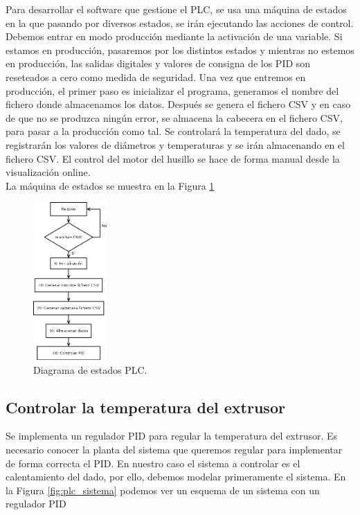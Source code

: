 Para desarrollar el software que gestione el PLC, se usa una máquina de estados en la que pasando por diversos estados, se irán ejecutando las acciones de control. Debemos entrar en modo producción mediante la activación de una variable. Si estamos en producción, pasaremos por los distintos estados y mientras no estemos en producción, las salidas digitales y valores de consigna de los PID son reseteados a cero como medida de seguridad. Una vez que entremos en producción, el primer paso es inicializar el programa, generamos el nombre del fichero donde almacenamos los datos. Después se genera el fichero CSV y en caso de que no se produzca ningún error, se almacena la cabecera en el fichero CSV, para pasar a la producción como tal. Se controlará la temperatura del dado, se registrarán los valores de diámetros y temperaturas y se irán almacenando en el fichero CSV. El control del motor del husillo se hace de forma manual desde la visualización online.\\

La máquina de estados se muestra en la Figura \ref{fig:plc_estados}

\begin{figure}[H]
    \centering
    \includegraphics[width=0.25\textwidth]{images/PLC/diagrama.png}
    \caption[Diagrama de estados PLC.]{Diagrama de estados PLC.}
    \label{fig:plc_estados}
\end{figure}

\subsection{Controlar la temperatura del extrusor}
\label{sec:plc_PID}

Se implementa un regulador PID para regular la temperatura del extrusor. Es necesario conocer la planta del sistema que queremos regular para implementar de forma correcta el PID. En nuestro caso el sistema a controlar es el calentamiento del dado, por ello, debemos modelar primeramente el sistema. En la Figura \ref{fig:plc_sistema} podemos ver un esquema de un sistema con un regulador PID\\

